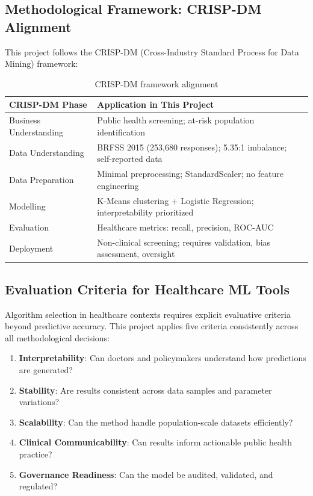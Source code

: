 \documentclass[12pt,a4paper]{article}
\begin{document}
\subsection{Methodological Framework: CRISP-DM Alignment}

This project follows the CRISP-DM (Cross-Industry Standard Process for Data Mining) framework:

\begin{table}[H]
\centering
\small
\begin{tabular}{|p{3.5cm}|p{9.5cm}|}
\hline
\textbf{CRISP-DM Phase} & \textbf{Application in This Project} \\
\hline
Business Understanding & Public health screening; at-risk population identification \\
\hline
Data Understanding & BRFSS 2015 (253,680 responses); 5.35:1 imbalance; self-reported data \\
\hline
Data Preparation & Minimal preprocessing; StandardScaler; no feature engineering \\
\hline
Modelling & K-Means clustering + Logistic Regression; interpretability prioritized \\
\hline
Evaluation & Healthcare metrics: recall, precision, ROC-AUC \\
\hline
Deployment & Non-clinical screening; requires validation, bias assessment, oversight \\
\hline
\end{tabular}
\caption{CRISP-DM framework alignment}
\label{tab:crisp_dm}
\end{table}

\subsection{Evaluation Criteria for Healthcare ML Tools}

Algorithm selection in healthcare contexts requires explicit evaluative criteria beyond predictive accuracy. This project applies five criteria consistently across all methodological decisions:

\begin{enumerate}
    \item \textbf{Interpretability}: Can doctors and policymakers understand how predictions are generated?
    \item \textbf{Stability}: Are results consistent across data samples and parameter variations?
    \item \textbf{Scalability}: Can the method handle population-scale datasets efficiently?
    \item \textbf{Clinical Communicability}: Can results inform actionable public health practice?
    \item \textbf{Governance Readiness}: Can the model be audited, validated, and regulated?
\end{enumerate}
\end{document}
